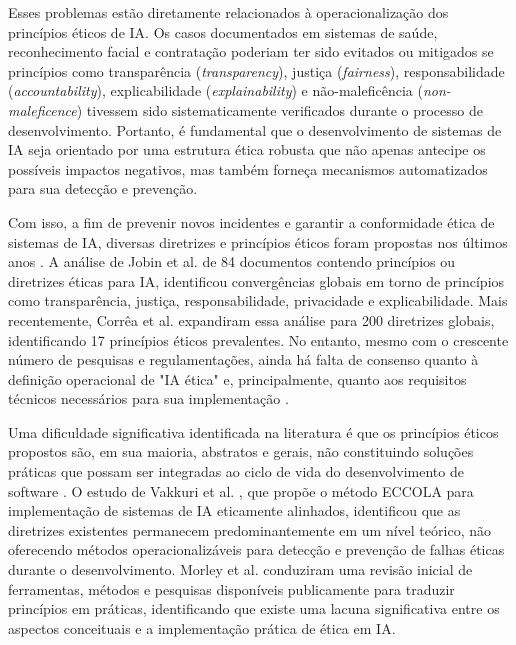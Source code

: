 Esses problemas estão diretamente relacionados à operacionalização dos princípios éticos de IA. Os casos documentados em sistemas de saúde, reconhecimento facial e contratação poderiam ter sido evitados ou mitigados se princípios como transparência (\textit{transparency}), justiça (\textit{fairness}), responsabilidade (\textit{accountability}), explicabilidade (\textit{explainability}) e não-maleficência (\textit{non-maleficence}) tivessem sido sistematicamente verificados durante o processo de desenvolvimento. Portanto, é fundamental que o desenvolvimento de sistemas de IA seja orientado por uma estrutura ética robusta que não apenas antecipe os possíveis impactos negativos, mas também forneça mecanismos automatizados para sua detecção e prevenção.

Com isso, a fim de prevenir novos incidentes e garantir a conformidade ética de sistemas de IA, diversas diretrizes e princípios éticos foram propostas nos últimos anos \cite{UNESCO2021, EUAIAct2024}. A análise de Jobin et al. \cite{Jobin2019} de 84 documentos contendo princípios ou diretrizes éticas para IA, identificou convergências globais em torno de princípios como transparência, justiça, responsabilidade, privacidade e explicabilidade. Mais recentemente, Corrêa et al. \cite{Corrêa2023} expandiram essa análise para 200 diretrizes globais, identificando 17 princípios éticos prevalentes. No entanto, mesmo com o crescente número de pesquisas e regulamentações, ainda há falta de consenso quanto à definição operacional de "IA ética" e, principalmente, quanto aos requisitos técnicos necessários para sua implementação \cite{Ryan2020}.

Uma dificuldade significativa identificada na literatura é que os princípios éticos propostos são, em sua maioria, abstratos e gerais, não constituindo soluções práticas que possam ser integradas ao ciclo de vida do desenvolvimento de software \cite{Mittelstadt2019, Hagendorff2020}. O estudo de Vakkuri et al. \cite{S012}, que propõe o método ECCOLA para implementação de sistemas de IA eticamente alinhados, identificou que as diretrizes existentes permanecem predominantemente em um nível teórico, não oferecendo métodos operacionalizáveis para detecção e prevenção de falhas éticas durante o desenvolvimento. Morley et al. \cite{Morley2020} conduziram uma revisão inicial de ferramentas, métodos e pesquisas disponíveis publicamente para traduzir princípios em práticas, identificando que existe uma lacuna significativa entre os aspectos conceituais e a implementação prática de ética em IA.


